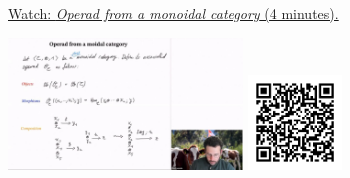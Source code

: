 
\begin{minipage}{10cm}
    \href{https://act4e-spring21.netlify.app/videos/spring2021-operads-a:operad-monoidal-cat.html}{Watch: \emph{Operad from a monoidal category} (4 minutes).}
        
    \href{https://act4e-spring21.netlify.app/videos/spring2021-operads-a:operad-monoidal-cat.html}{\includegraphics[height=3.5cm]{spring2021-operads-a:operad-monoidal-cat/thumbnails.jpg}}
    \href{https://act4e-spring21.netlify.app/videos/spring2021-operads-a:operad-monoidal-cat.html}{\includegraphics[height=2.5cm]{spring2021-operads-a:operad-monoidal-cat/qrcode.png}}
\end{minipage}
